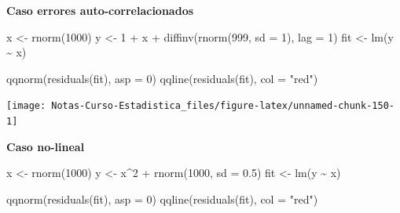 \documentclass[
  12pt,
]{book}
\newenvironment{Shaded}{\begin{snugshade}}{\end{snugshade}}
\newcommand{\AttributeTok}[1]{\textcolor[rgb]{0.77,0.63,0.00}{#1}}
\newcommand{\DecValTok}[1]{\textcolor[rgb]{0.00,0.00,0.81}{#1}}
\newcommand{\FloatTok}[1]{\textcolor[rgb]{0.00,0.00,0.81}{#1}}
\newcommand{\FunctionTok}[1]{\textcolor[rgb]{0.00,0.00,0.00}{#1}}
\newcommand{\NormalTok}[1]{#1}
\newcommand{\OtherTok}[1]{\textcolor[rgb]{0.56,0.35,0.01}{#1}}
\newcommand{\SpecialCharTok}[1]{\textcolor[rgb]{0.00,0.00,0.00}{#1}}
\newcommand{\StringTok}[1]{\textcolor[rgb]{0.31,0.60,0.02}{#1}}
\begin{document}
\textbf{Caso errores auto-correlacionados}

\begin{Shaded}
\begin{Highlighting}[]
\NormalTok{x }\OtherTok{\textless{}{-}} \FunctionTok{rnorm}\NormalTok{(}\DecValTok{1000}\NormalTok{)}
\NormalTok{y }\OtherTok{\textless{}{-}} \DecValTok{1} \SpecialCharTok{+}\NormalTok{ x }\SpecialCharTok{+} \FunctionTok{diffinv}\NormalTok{(}\FunctionTok{rnorm}\NormalTok{(}\DecValTok{999}\NormalTok{, }\AttributeTok{sd =} \DecValTok{1}\NormalTok{), }\AttributeTok{lag =} \DecValTok{1}\NormalTok{)}
\NormalTok{fit }\OtherTok{\textless{}{-}} \FunctionTok{lm}\NormalTok{(y }\SpecialCharTok{\textasciitilde{}}\NormalTok{ x)}
\end{Highlighting}
\end{Shaded}

\begin{Shaded}
\begin{Highlighting}[]
\FunctionTok{qqnorm}\NormalTok{(}\FunctionTok{residuals}\NormalTok{(fit), }\AttributeTok{asp =} \DecValTok{0}\NormalTok{)}
\FunctionTok{qqline}\NormalTok{(}\FunctionTok{residuals}\NormalTok{(fit), }\AttributeTok{col =} \StringTok{"red"}\NormalTok{)}
\end{Highlighting}
\end{Shaded}

\begin{center}\texttt{[image: Notas-Curso-Estadistica\_files/figure-latex/unnamed-chunk-150-1]} \end{center}

\textbf{Caso no-lineal}

\begin{Shaded}
\begin{Highlighting}[]
\NormalTok{x }\OtherTok{\textless{}{-}} \FunctionTok{rnorm}\NormalTok{(}\DecValTok{1000}\NormalTok{)}
\NormalTok{y }\OtherTok{\textless{}{-}}\NormalTok{ x}\SpecialCharTok{\^{}}\DecValTok{2} \SpecialCharTok{+} \FunctionTok{rnorm}\NormalTok{(}\DecValTok{1000}\NormalTok{, }\AttributeTok{sd =} \FloatTok{0.5}\NormalTok{)}
\NormalTok{fit }\OtherTok{\textless{}{-}} \FunctionTok{lm}\NormalTok{(y }\SpecialCharTok{\textasciitilde{}}\NormalTok{ x)}
\end{Highlighting}
\end{Shaded}

\begin{Shaded}
\begin{Highlighting}[]
\FunctionTok{qqnorm}\NormalTok{(}\FunctionTok{residuals}\NormalTok{(fit), }\AttributeTok{asp =} \DecValTok{0}\NormalTok{)}
\FunctionTok{qqline}\NormalTok{(}\FunctionTok{residuals}\NormalTok{(fit), }\AttributeTok{col =} \StringTok{"red"}\NormalTok{)}
\end{Highlighting}
\end{Shaded}
\end{document}
